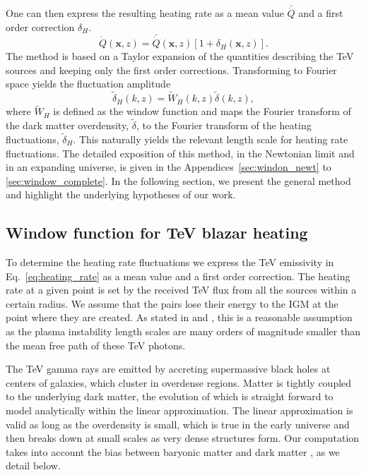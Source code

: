 \documentclass[numberedappendix]{emulateapj}
\begin{document}
One can then express the resulting heating rate as a mean value $\bar{\dot{Q}}$ and a first order correction $\delta_H$.
\begin{equation}
\label{eq:delta_h}
\dot{Q}(\mathbf{x},z)=\bar{\dot{Q}}(\mathbf{x},z)\left[1+\delta_H(\mathbf{x},z)\right].
\end{equation}
The method is based on a Taylor expansion of the quantities describing the TeV sources and keeping only the first order corrections. Transforming to Fourier space yields the fluctuation amplitude
\begin{equation}
\label{eq:use_window}
\tilde{\delta}_H(k,z)=\tilde{W}_H(k,z)\tilde{\delta}(k,z),
\end{equation}
where $\tilde{W}_H$ is defined as the window function and maps the Fourier transform of the dark matter overdensity, $\tilde{\delta}$, to the Fourier transform of the heating fluctuations, $\tilde{\delta}_H$. This naturally yields the relevant length scale for heating rate fluctuations. The detailed exposition of this method, in the Newtonian limit and in an expanding universe, is given in the Appendices~\ref{sec:windon_newt} to \ref{sec:window_complete}. In the following section, we present the general method and highlight the underlying hypotheses of our work.

\subsection{Window function for TeV blazar heating}\label{sec:window}
To determine the heating rate fluctuations we express the TeV emissivity in Eq.~\eqref{eq:heating_rate} as a mean value and a first order correction. The heating rate at a given point is set by the received TeV flux from all the sources within a certain radius. We assume that the pairs lose their energy to the IGM at the point where they are created. As stated in \citet{2012ApJ...752...22B} and \citet{2014arXiv1410.3797C}, this is a reasonable assumption as the plasma instability length scales are many orders of magnitude smaller than the mean free path of these TeV photons.

The TeV gamma rays are emitted by accreting supermassive black holes at centers of galaxies, which cluster in overdense regions. Matter is tightly coupled to the underlying dark matter, the evolution of which is straight forward to model analytically within the linear approximation. The linear approximation is valid as long as the overdensity is small, which is true in the early universe and then breaks down at small scales as very dense structures form. Our computation takes into account the bias between baryonic matter and dark matter \citep{1996MNRAS.282..347M}, as we detail below.
\end{document}
